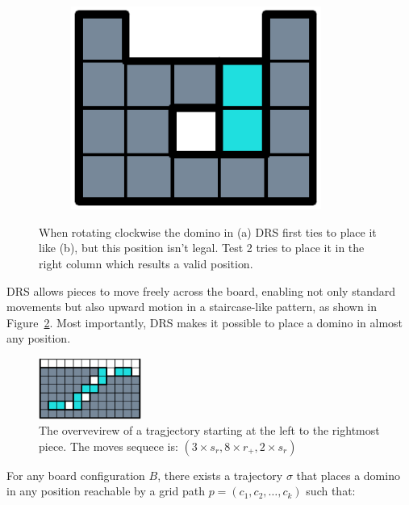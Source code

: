 \begin{figure}[ht]
\begin{subfigure}[b]{0.15\textwidth}
    \includegraphics[width=0.9\textwidth]{pictures/dominoes/drs-3.pdf}
    \caption{}
  \end{subfigure}
  \caption{When rotating clockwise the domino in (a) DRS first ties to place it like (b), but this position isn't legal. Test 2 tries to place it in the right column which results a valid position.}
  \label{dom:drs}
\end{figure}

DRS allows pieces to move freely across the board, enabling not only standard movements but also upward motion in a staircase-like pattern, as shown in Figure~\ref{dom:staircase}. Most importantly, DRS makes it possible to place a domino in almost any position.

\begin{figure}
  \centering
  \includegraphics[width=0.3\textwidth]{pictures/dominoes/staricase.pdf}
  \caption{The overvevirew of a tragjectory starting at the left to the rightmost piece. The moves sequece is: $(3 \times s_r, 8 \times r_+, 2 \times s_r)$}
  \label{dom:staircase}
\end{figure}

\begin{lemma0}
For any board configuration \( B \), there exists a trajectory $\sigma$ that places a domino in any position reachable by a grid path \( p = (c_1, c_2, \dots, c_k) \) such that:
\end{lemma0}

